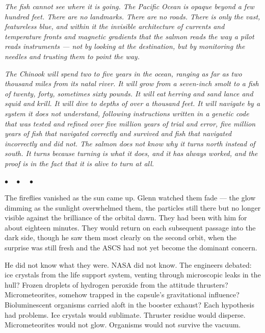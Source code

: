 \documentclass[12pt, letterpaper]{article}
\begin{document}
\emph{The fish cannot see where it is going. The Pacific Ocean is opaque beyond a few hundred feet. There are no landmarks. There are no roads. There is only the vast, featureless blue, and within it the invisible architecture of currents and temperature fronts and magnetic gradients that the salmon reads the way a pilot reads instruments --- not by looking at the destination, but by monitoring the needles and trusting them to point the way.}

\emph{The Chinook will spend two to five years in the ocean, ranging as far as two thousand miles from its natal river. It will grow from a seven-inch smolt to a fish of twenty, forty, sometimes sixty pounds. It will eat herring and sand lance and squid and krill. It will dive to depths of over a thousand feet. It will navigate by a system it does not understand, following instructions written in a genetic code that was tested and refined over five million years of trial and error, five million years of fish that navigated correctly and survived and fish that navigated incorrectly and did not. The salmon does not know why it turns north instead of south. It turns because turning is what it does, and it has always worked, and the proof is in the fact that it is alive to turn at all.}

\begin{center}
$\bullet\quad\bullet\quad\bullet$
\end{center}

The fireflies vanished as the sun came up. Glenn watched them fade --- the glow dimming as the sunlight overwhelmed them, the particles still there but no longer visible against the brilliance of the orbital dawn. They had been with him for about eighteen minutes. They would return on each subsequent passage into the dark side, though he saw them most clearly on the second orbit, when the surprise was still fresh and the ASCS had not yet become the dominant concern.

He did not know what they were. NASA did not know. The engineers debated: ice crystals from the life support system, venting through microscopic leaks in the hull? Frozen droplets of hydrogen peroxide from the attitude thrusters? Micrometeorites, somehow trapped in the capsule's gravitational influence? Bioluminescent organisms carried aloft in the booster exhaust? Each hypothesis had problems. Ice crystals would sublimate. Thruster residue would disperse. Micrometeorites would not glow. Organisms would not survive the vacuum.
\end{document}
